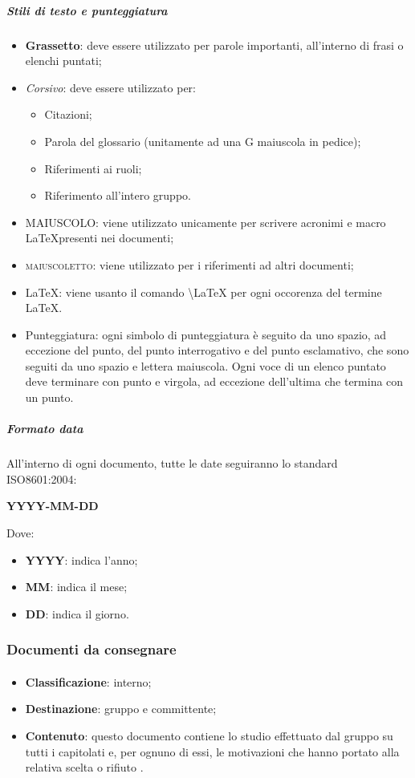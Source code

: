 				\subparagraph{Stili di testo e punteggiatura}
				\begin{itemize}
					\item \textbf{Grassetto}: deve essere utilizzato per parole importanti, all’interno di frasi o elenchi puntati;
					\item \textit{Corsivo}: deve essere utilizzato per:
					\begin{itemize}
						\item Citazioni;
						\item Parola del glossario (unitamente ad una G maiuscola in pedice);
						\item Riferimenti ai ruoli;
						\item Riferimento all’intero gruppo.
					\end{itemize}
					\item MAIUSCOLO: viene utilizzato unicamente per scrivere acronimi e macro \LaTeX presenti nei documenti;
					\item \textsc{maiuscoletto}: viene utilizzato per i riferimenti ad altri documenti;
					\item \LaTeX: viene usanto il comando \textbackslash{LaTeX} per ogni occorenza del termine \LaTeX.
					\item Punteggiatura: ogni simbolo di punteggiatura è seguito da uno spazio, ad eccezione del punto, del punto interrogativo e del punto esclamativo, che sono seguiti da uno spazio e lettera maiuscola. Ogni voce di un elenco puntato deve terminare con punto e virgola, ad eccezione dell’ultima che termina con un punto. 
					\end{itemize}
	
				\subparagraph{Formato data}
				All’interno di ogni documento, tutte le date seguiranno lo standard ISO\ped{G}8601:2004:
				\begin{center}
					\textbf{YYYY-MM-DD}
				\end{center}
				Dove:
				\begin{itemize}
					\item \textbf{YYYY}: indica l’anno;
					\item \textbf{MM}: indica il mese;
					\item \textbf{DD}: indica il giorno.
				\end{itemize}
		
		\subsubsection{Documenti da consegnare}
			\paragraph{\SdF}
			\begin{itemize}
				\item \textbf{Classificazione}: interno;
				\item \textbf{Destinazione}: gruppo e committente;
				\item \textbf{Contenuto}: questo documento contiene lo studio effettuato dal gruppo \textit{\gruppo} su tutti i capitolati e, per ognuno di essi, le motivazioni che hanno portato alla relativa scelta o rifiuto .
			\end{itemize}


